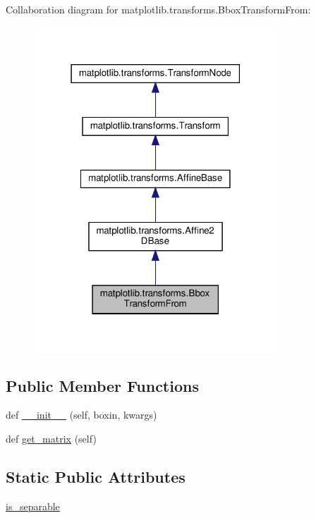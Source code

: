 Collaboration diagram for matplotlib.\+transforms.\+Bbox\+Transform\+From\+:
\nopagebreak
\begin{figure}[H]
\begin{center}
\leavevmode
\includegraphics[width=259pt]{classmatplotlib_1_1transforms_1_1BboxTransformFrom__coll__graph}
\end{center}
\end{figure}
\subsection*{Public Member Functions}
\begin{DoxyCompactItemize}
\item 
def \hyperlink{classmatplotlib_1_1transforms_1_1BboxTransformFrom_a835639609db8d373d58e2cfb7cb247a0}{\+\_\+\+\_\+init\+\_\+\+\_\+} (self, boxin, kwargs)
\item 
def \hyperlink{classmatplotlib_1_1transforms_1_1BboxTransformFrom_a8645cd23b5de791dd2c0a9a437cb23cd}{get\+\_\+matrix} (self)
\end{DoxyCompactItemize}
\subsection*{Static Public Attributes}
\begin{DoxyCompactItemize}
\item 
\hyperlink{classmatplotlib_1_1transforms_1_1BboxTransformFrom_abe8550e9a5421caf20f65420d694f178}{is\+\_\+separable}
\end{DoxyCompactItemize}


